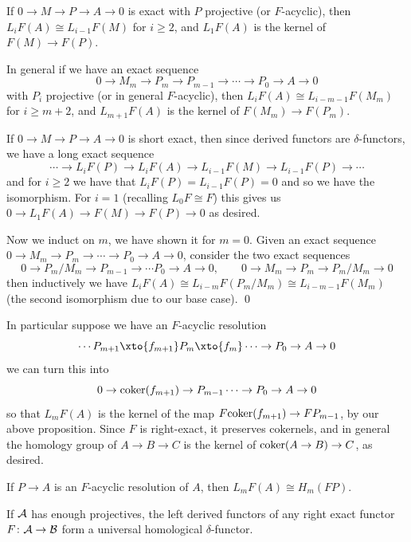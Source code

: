 \eproof

\bprop[title=Dimension shifting]

    If $0\to M\to P\to A\to0$ is exact with $P$ projective (or $F$-acyclic), then $L_iF(A)\cong L_{i-1}F(M)$ for $i\geq2$,
    and $L_1F(A)$ is the kernel of $F(M)\to F(P)$.

    In general if we have an exact sequence
    $$ 0 \to M_m \to P_m \to P_{m-1} \to \cdots \to P_0 \to A \to 0 $$
    with $P_i$ projective (or in general $F$-acyclic), then $L_iF(A)\cong L_{i-m-1}F(M_m)$ for $i\geq m+2$, and $L_{m+1}F(A)$ is the kernel of
    $F(M_m)\to F(P_m)$.

\eprop

\bproof

    If $0\to M\to P\to A\to0$ is short exact, then since derived functors are $\delta$-functors, we have a long exact sequence
    $$ \cdots\to L_iF(P) \to L_iF(A) \to L_{i-1}F(M) \to L_{i-1}F(P) \to \cdots $$
    and for $i\geq2$ we have that $L_iF(P)=L_{i-1}F(P)=0$ and so we have the isomorphism.
    For $i=1$ (recalling $L_0F\cong F$) this gives us $0\to L_1F(A)\to F(M)\to F(P)\to0$ as desired.

    Now we induct on $m$, we have shown it for $m=0$.
    Given an exact sequence $0\to M_m\to P_m\to\cdots\to P_0\to A\to0$, consider the two exact sequences
    $$ 0 \to P_m/M_m \to P_{m-1} \to \cdots P_0\to A\to0,\qquad 0\to M_m \to P_m \to P_m/M_m\to 0 $$
    then inductively we have $L_iF(A)\cong L_{i-m}F(P_m/M_m)\cong L_{i-m-1}F(M_m)$ (the second isomorphism due to our base case).
    \qed

\eproof

In particular suppose we have an $F$-acyclic resolution
$$ \cdots P_{m+1} \xto{f_{m+1}} P_m \xto{f_m} \cdots \to P_0 \to A \to 0 $$
we can turn this into
$$ 0 \to {\rm coker}(f_{m+1}) \to P_{m-1} \cdots \to P_0 \to A \to 0 $$
so that $L_mF(A)$ is the kernel of the map $F{\rm coker}(f_{m+1})\to FP_{m-1}$, by our above proposition.
Since $F$ is right-exact, it preserves cokernels, and in general the homology group of $A\to B\to C$ is the kernel of ${\rm coker}(A\to B)\to C$, as desired.

\bprop

    If $P\to A$ is an $F$-acyclic resolution of $A$, then $L_mF(A)\cong H_m(FP)$.

\eprop

\bthrm

    If ${{\cal A}}$ has enough projectives, the left derived functors of any right exact functor $F\colon{{\cal A}}\to{{\cal B}}$ form a universal homological $\delta$-functor.

